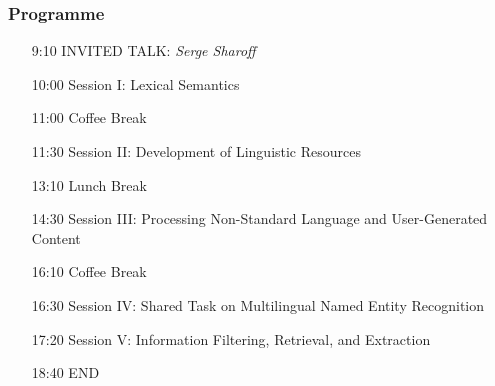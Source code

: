 \documentclass{beamer}
\begin{document}






\begin{frame}
 \frametitle{Programme}

\begin{itemize}

\item[9:10] INVITED TALK: \textit{Serge Sharoff}

\item[10:00] Session I: Lexical Semantics

\item[11:00] {\color{darkgreen}Coffee Break}

\item[11:30] Session II: Development of Linguistic Resources

\item[13:10] {\color{darkgreen}Lunch Break}

\item[14:30] Session III: Processing Non-Standard Language and User-Generated Content

\item[16:10] {\color{darkgreen}Coffee Break}

\item[16:30] Session IV: Shared Task on Multilingual Named Entity Recognition

\item[17:20] Session V: Information Filtering, Retrieval, and Extraction

\item[18:40] END 

\end{itemize}

\end{frame}


 



\end{document}
